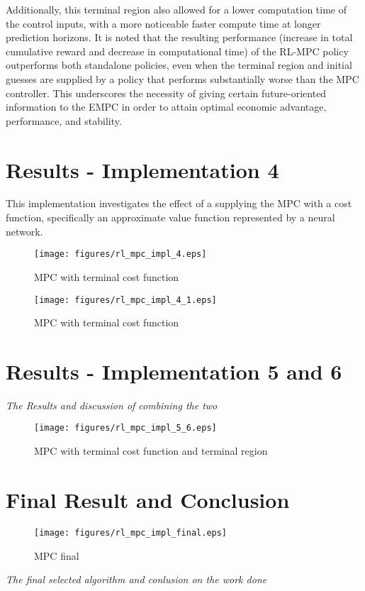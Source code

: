 Additionally, this terminal region also allowed for a lower computation time of the control inputs, with a more noticeable faster compute time at longer prediction horizons. It is noted that the resulting performance (increase in total cumulative reward and decrease in computational time) of the RL-MPC policy outperforms both standalone policies, even when the terminal region and initial guesses are supplied by a policy that performs substantially worse than the MPC controller. This underscores the necessity of giving certain future-oriented information to the EMPC in order to attain optimal economic advantage, performance, and stability.

\section{Results - Implementation 4}
This implementation investigates the effect of a supplying the MPC with a cost function, specifically an approximate value function represented by a neural network.


\begin{figure}[H]
	\centering
	\texttt{[image: figures/rl\_mpc\_impl\_4.eps]}
	\caption{MPC with terminal cost function}
	\label{fig:rlmpc-impl4}
\end{figure}

\begin{figure}[H]
	\centering
	\texttt{[image: figures/rl\_mpc\_impl\_4\_1.eps]}
	\caption{MPC with terminal cost function}
	\label{fig:rlmpc-impl4-1}
\end{figure}

\section{Results - Implementation 5 and 6}
\emph{The Results and discussion of combining the two}

\begin{figure}[H]
	\centering
	\texttt{[image: figures/rl\_mpc\_impl\_5\_6.eps]}
	\caption{MPC with terminal cost function and terminal region}
	\label{fig:rlmpc-impl5-6}
\end{figure}


\section{Final Result and Conclusion}

\begin{figure}[H]
	\centering
	\texttt{[image: figures/rl\_mpc\_impl\_final.eps]}
	\caption{MPC final }
	\label{fig:rlmpc-final}
\end{figure}
\emph{The final selected algorithm and conlusion on the work done}

